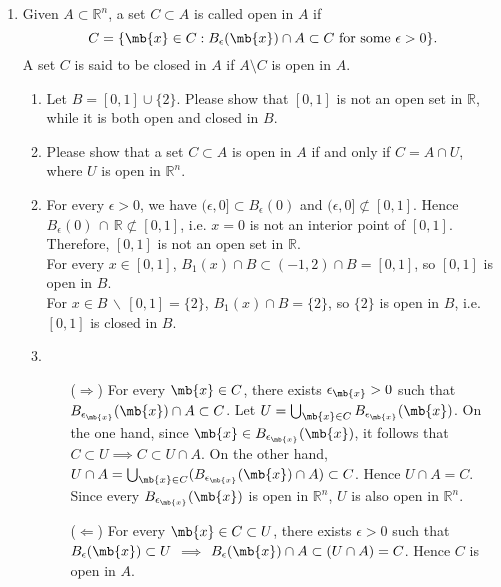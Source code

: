 \begin{exercise}
\begin{enumerate}
		\item Given $A\subset\mathbb{R}^n$, a set $C\subset A$ is called open in $A$ if $$C=\{\mb{x}\in C: B_{\epsilon}(\mb{x})\cap A \subset C\ \text{for some}\ \epsilon>0\}.$$
			A set $C$ is said to be closed in $A$ if $A\setminus C$ is open in $A$.
			\begin{enumerate}
				\item Let $B= [0,1] \cup \{2\}$.  Please show that $[0,1]$ is not an open set in $\mathbb{R}$, while it is both open and closed in $B$.
				\item Please show that a set $C \subset A$ is open in $A$ if and only if $C=A\cap U$, where $U$ is open in $\mathbb{R}^n$.
			\end{enumerate}

			\begin{solution}
				\begin{enumerate}
					\item []
					\item For every $\epsilon>0$, we have $(\epsilon,0]\subset B_\epsilon(0)$ and $(\epsilon,0]\not\subset [0,1]$.
						Hence $B_\epsilon(0)\,\cap\, \mathbb{R} \not\subset [0,1]$, i.e. $x=0$ is not an interior point of $[0,1]$. Therefore, $[0,1]$ is not an open set in $\mathbb{R}$. \\
						For every $x\in [0,1]$, $B_1(x) \cap B \subset (-1,2)\cap B = [0,1]$, so $[0,1]$ is open in $B$.\\
						For $x\in B\,\backslash\,[0,1] = \{2\}$, $B_1(x) \cap B = \{2\}$, so $\{2\}$ is open in $B$, i.e. $[0,1]$ is closed in $B$.
					\item
						\begin{itemize}
							\item [($\Rightarrow$)]
								For every $\mb{x}\in C$, there exists $\epsilon_\mb{x}>0$ such that $B_{\epsilon_\mb{x}}(\mb{x})\cap A \subset C$. Let $U = \bigcup_{\mb{x}\in C}B_{\epsilon_\mb{x}}(\mb{x})$.
								On the one hand, since $\mb{x} \in B_{\epsilon_\mb{x}}(\mb{x})$, it follows that $C \subset U \implies C \subset U\cap A$.
								On the other hand, $U \cap A=\bigcup_{\mb{x}\in C} (B_{\epsilon_\mb{x}}(\mb{x}) \cap A) \subset C$. Hence $U \cap A = C$. Since every $B_{\epsilon_\mb{x}}(\mb{x})$ is open in $\mathbb{R}^n$, $U$ is also open in $\mathbb{R}^n$.
							\item [($\Leftarrow$)]
								For every $\mb{x}\in C\subset U$, there exists $\epsilon>0$ such that $B_\epsilon(\mb{x})\subset U $ $\implies$ $ B_\epsilon(\mb{x})\cap A \subset (U\cap A) = C$. Hence $C$ is open in $A$.
								\qedhere
						\end{itemize}
				\end{enumerate}
			\end{solution}

	\end{enumerate}
\end{exercise}



